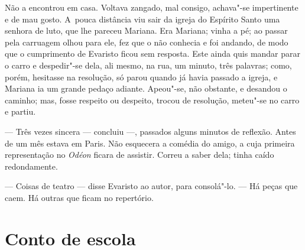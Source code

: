 \begin{linenumbers}
Não a encontrou em casa. Voltava zangado, mal consigo, achava"-se
impertinente e de mau gosto. A~pouca distância viu sair da igreja do
Espírito Santo uma senhora de luto, que lhe pareceu Mariana. Era
Mariana; vinha a pé; ao passar pela carruagem olhou para ele, fez que o
não conhecia e foi andando, de modo que o cumprimento de Evaristo ficou
sem resposta. Este ainda quis mandar parar o carro e despedir"-se dela,
ali mesmo, na rua, um minuto, três palavras; como, porém, hesitasse na
resolução, só parou quando já havia passado a igreja, e Mariana ia um
grande pedaço adiante. Apeou"-se, não obstante, e desandou o caminho;
mas, fosse respeito ou despeito, trocou de resolução, meteu"-se no carro
e partiu.

--- Três vezes sincera --- concluiu ---, passados alguns minutos de
reflexão. Antes de um mês estava em Paris. Não esquecera a comédia do
amigo, a cuja primeira representação no \emph{Odéon} ficara de assistir.
Correu a saber dela; tinha caído redondamente.

--- Coisas de teatro --- disse Evaristo ao autor, para consolá"-lo. --- Há
peças que caem. Há outras que ficam no repertório.

\end{linenumbers}

\chapter{Conto de escola}

